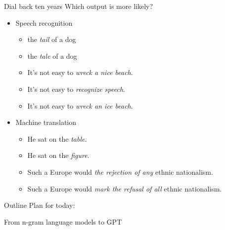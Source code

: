 \documentclass[usenames,dvipsnames,notes,11pt,aspectratio=169,hyperref={colorlinks=true, linkcolor=blue}]{beamer}
\newcommand{\pdfnote}[1]{}
\begin{document}
\begin{frame}
    {Dial back ten years}
    Which output is more likely?
    \begin{itemize}
        \item Speech recognition
            \begin{itemize}
                \item[] the \textit{tail} of a dog
                \item[] the \textit{tale} of a dog
            \end{itemize}
            \begin{itemize}
                \item[] It's not easy to \textit{wreck a nice beach}. 
                \item[] It's not easy to \textit{recognize speech}. 
                \item[] It's not easy to \textit{wreck an ice beach}.
            \end{itemize}
        \item Machine translation 
            \begin{itemize}
                \item[] He sat on the \textit{table}.
                \item[] He sat on the \textit{figure}.
            \end{itemize}
            \begin{itemize}
                \item[] Such a Europe would \textit{the rejection of any} ethnic nationalism. 
                \item[] Such a Europe would \textit{mark the refusal of all} ethnic nationalism. 
            \end{itemize}
    \end{itemize}
    \pdfnote{
        In earlier systems of speech recognition and machine translation,
        the acousitic model and the translation model would produce multiple rough translations, and the language model is used to reweight these outputs by how likely they are English sentences.
    }
\end{frame}

\begin{frame}
    {Outline}
    Plan for today:

    From n-gram language models to GPT
\end{frame}
\end{document}

